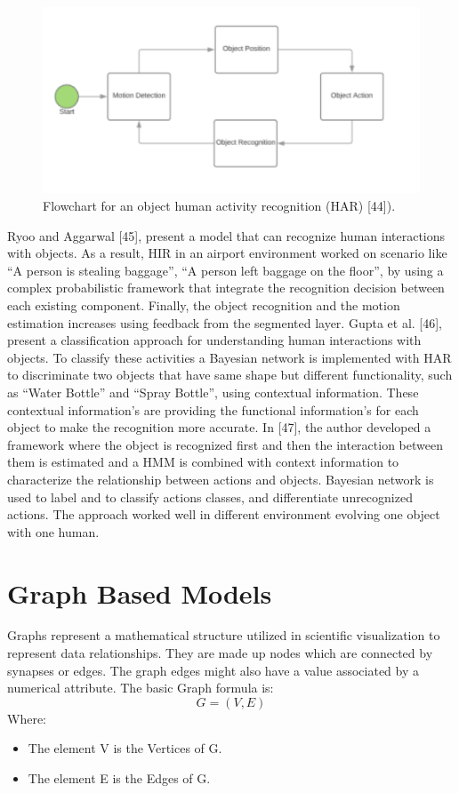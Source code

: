 \begin{figure}[ht]
\centering
\includegraphics{Figures/ht1}
\decoRule
\caption[Flowchart for an object human activity recognition (HAR) "44"]{Flowchart for an object human activity recognition (HAR) [44]).}
\label{fig:la}
\end{figure}
Ryoo and Aggarwal [45], present a model that can recognize human interactions with objects. As a result, HIR in an airport environment worked on scenario like “A person is stealing baggage”, “A person left baggage on the floor”, by using a complex probabilistic framework that integrate the recognition decision between each existing component. Finally, the object recognition and the motion estimation increases using feedback from the segmented layer. Gupta et al. [46], present a classification approach for understanding human interactions with objects. To classify these activities a Bayesian network is implemented with HAR to discriminate two objects that have same shape but different functionality, such as “Water Bottle” and “Spray Bottle”, using contextual information. These contextual information’s are providing the functional information’s for each object to make the recognition more accurate. In [47], the author developed a framework where the object is recognized first and then the interaction between them is estimated and a HMM is combined with context information to characterize the relationship between actions and objects. Bayesian network is used to label and to classify actions classes, and differentiate unrecognized actions. The approach worked well in different environment evolving one object with one human.

\section{Graph Based Models}
\hspace{5mm} Graphs represent a mathematical structure utilized in scientific visualization to represent data relationships. They are made up nodes which are connected by synapses or edges. The graph edges might also have a value associated by a numerical attribute.  
The basic Graph formula is:
\[G = (V, E)\]
Where:
\begin{itemize}
\item The element V is the Vertices of G.
\item The element E is the Edges of G.  
\end{itemize}

